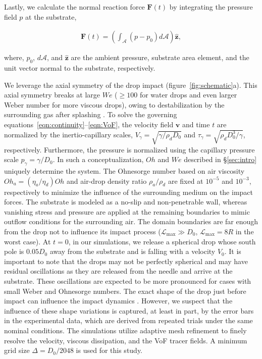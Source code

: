 \documentclass{jfm}
\begin{document}
\noindent Lastly, we calculate the normal reaction force $\boldsymbol{F}(t)$ by integrating the pressure field $p$ at the substrate,

\begin{align}\label{Eqn:ReactionForce}
	\boldsymbol{F}(t) = \left(\int_\mathcal{A} \left(p-p_0\right)d\mathcal{A}\right)\hat{\boldsymbol{z}},
\end{align}

\noindent where, $p_0$, $d\mathcal{A}$, and $\hat{\boldsymbol{z}}$ are the ambient pressure, substrate area element, and the unit vector normal to the substrate, respectively. 

We leverage the axial symmetry of the drop impact (figure~\ref{fig:schematic}a). This axial symmetry breaks at large $We$ ($\ge 100$ for water drops and even larger Weber number for more viscous drops), owing to destabilization by the surrounding gas after splashing \citep{xu2005drop, Eggers2010, Driscoll2011, riboux2014experiments, Josserand2016, zhang2022impact}. 
To solve the governing equations~\eqref{eqn:continuity}--\eqref{eqn:VoF}, the velocity field $\boldsymbol{v}$ and time $t$ are normalized by the inertio-capillary scales, $V_\gamma = \sqrt{\gamma/\rho_dD_0}$ and $\tau_\gamma = \sqrt{\rho_dD_0^3/\gamma}$, respectively. Furthermore, the pressure is normalized using the capillary pressure scale $p_\gamma = \gamma/D_0$. In such a conceptualization, $Oh$ and $We$ described in \S\ref{sec:intro} uniquely determine the system. 
The Ohnesorge number based on air viscosity $Oh_a = \left(\eta_a/\eta_d\right)Oh$ and air-drop density ratio $\rho_a/\rho_d$ are fixed at $10^{-5}$ and $10^{-3}$, respectively to minimize the influence of the surrounding medium on the impact forces. 
The substrate is modeled as a no-slip and non-penetrable wall, whereas vanishing stress and pressure are applied at the remaining boundaries to mimic outflow conditions for the surrounding air. The domain boundaries are far enough from the drop not to influence its impact process ($\mathcal{L}_\text{max} \gg D_0$, $\mathcal{L}_\text{max} = 8R$ in the worst case). At $t = 0$, in our simulations, we release a spherical drop whose south pole is $0.05D_0$ away from the substrate and is falling with a velocity $V_0$. It is important to note that the drops may not be perfectly spherical and may have residual oscillations as they are released from the needle and arrive at the substrate. These oscillations are expected to be more pronounced for cases with small Weber and Ohnesorge numbers. The exact shape of the drop just before impact can influence the impact dynamics \citep{thoraval-2013-jfm, yun2017bouncing}. However, we suspect that the influence of these shape variations is captured, at least in part, by the error bars in the experimental data, which are derived from repeated trials under the same nominal conditions.
The simulations utilize adaptive mesh refinement to finely resolve the velocity, viscous dissipation, and the VoF tracer fields. A minimum grid size $\Delta = D_0/2048$ is used for this study. 
\end{document}
